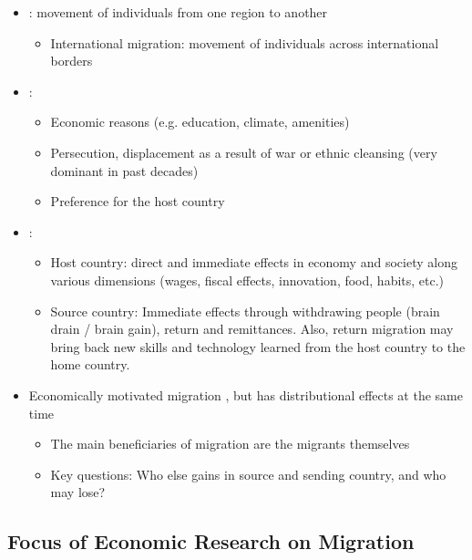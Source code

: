         \begin{itemize}
            \item {}: movement of individuals from one region to another
                \begin{itemize}
                    \item International migration: movement of individuals across international borders
                \end{itemize}
            \item {}: 
                \begin{itemize}
                    \item Economic reasons (e.g. education, climate, amenities)
                    \item Persecution, displacement as a result of war or ethnic cleansing (very dominant in past decades)
                    \item Preference for the host country 
                \end{itemize}
            \item {}:
                \begin{itemize}
                    \item Host country: direct and immediate effects in economy and society along various dimensions (wages, fiscal effects, innovation, food, habits, etc.)
                    \item Source country: Immediate effects through withdrawing people (brain drain / brain gain), return and remittances. Also, return migration may bring back new skills and technology learned from the host country to the home country.
                \end{itemize}
            \item Economically motivated migration , but has distributional effects at the same time
                \begin{itemize}
                    \item The main beneficiaries of migration are the migrants themselves
                    \item Key questions: Who else gains in source and sending country, and who may lose?
                \end{itemize}
        \end{itemize}

    \subsection{Focus of Economic Research on Migration}
    
